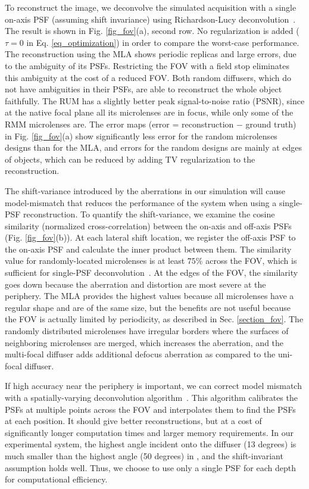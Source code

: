 \documentclass{osa-article}
\begin{document}
To reconstruct the image, we deconvolve the simulated acquisition with a single on-axis PSF (assuming shift invariance) using Richardson-Lucy deconvolution~\cite{richardson1972rl,lucy1974rl}. The result is shown in Fig. \ref{fig_fov}(a), second row. No regularization is added ($\tau=0$ in Eq. \ref{eq_optimization}) in order to compare the worst-case performance. The reconstruction using the MLA shows periodic replicas and large errors, due to the ambiguity of its PSFs. Restricting the FOV with a field stop eliminates this ambiguity at the cost of a reduced FOV. Both random diffusers, which do not have ambiguities in their PSFs, are able to reconstruct the whole object faithfully. The RUM has a slightly better peak signal-to-noise ratio (PSNR), since at the native focal plane all its microlenses are in focus, while only some of the RMM microlenses are. The error maps (error = reconstruction $-$ ground truth) in Fig. \ref{fig_fov}(a) show significantly less error for the random microlenses designs than for the MLA, and errors for the random designs are mainly at edges of objects, which can be reduced by adding TV regularization to the reconstruction.

The shift-variance introduced by the aberrations in our simulation will cause model-mismatch that reduces the performance of the system when using a single-PSF reconstruction. To quantify the shift-variance, we examine the cosine similarity (normalized cross-correlation) between the on-axis and off-axis PSFs (Fig. \ref{fig_fov}(b)). At each lateral shift location, we register the off-axis PSF to the on-axis PSF \cite{guizar2008registration} and calculate the inner product between them. The similarity value for randomly-located microlenses is at least $75 \%$ across the FOV, which is sufficient for single-PSF deconvolution~\cite{antipa2018diffusercam}. At the edges of the FOV, the similarity goes down because the aberration and distortion are most severe at the periphery. The MLA provides the highest values because all microlenses have a regular shape and are of the same size, but the benefits are not useful because the FOV is actually limited by periodicity, as described in Sec. \ref{section_fov}. The randomly distributed microlenses have irregular borders where the surfaces of neighboring microlenses are merged, which increases the aberration, and the multi-focal diffuser adds additional defocus aberration as compared to the uni-focal diffuser.

If high accuracy near the periphery is important, we can correct model mismatch with a spatially-varying deconvolution algorithm~\cite{kuo2020flatscope}. This algorithm calibrates the PSFs at multiple points across the FOV and interpolates them to find the PSFs at each position. It should give better reconstructions, but at a cost of significantly longer computation times and larger memory requirements. In our experimental system, the highest angle incident onto the diffuser (13 degrees) is much smaller than the highest angle (50 degrees) in \cite{kuo2020flatscope}, and the shift-invariant assumption holds well. Thus, we choose to use only a single PSF for each depth for computational efficiency.
\end{document}
